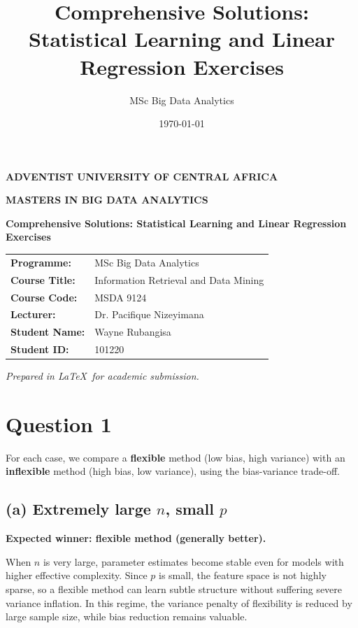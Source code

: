 \documentclass[12pt]{article}
\title{Comprehensive Solutions: Statistical Learning and Linear Regression Exercises}
\author{MSc Big Data Analytics}
\date{\today}
\begin{document}
\begin{titlepage}
\centering
\vspace*{1.5cm}

{\Large \textbf{ADVENTIST UNIVERSITY OF CENTRAL AFRICA}\par}
\vspace{0.4cm}
{\large \textbf{MASTERS IN BIG DATA ANALYTICS}\par}
\vspace{0.4cm}

\vspace{1.8cm}
\vspace{0.5cm}
{\Large \textbf{Comprehensive Solutions: Statistical Learning and Linear Regression Exercises}\par}

\vspace{1.5cm}
\begin{tabular}{>{\bfseries}p{6cm}p{8cm}}
Programme: & MSc Big Data Analytics \\
Course Title: & Information Retrieval and Data Mining \\
Course Code: & MSDA 9124 \\
Lecturer: & Dr. Pacifique Nizeyimana \\
Student Name: & Wayne Rubangisa \\
Student ID: & 101220 \\
\end{tabular}

\vfill
{\normalsize \textit{Prepared in \LaTeX\ for academic submission.}\par}
\vspace{0.8cm}
\end{titlepage}

\section*{Question 1}
For each case, we compare a \textbf{flexible} method (low bias, high variance) with an \textbf{inflexible} method (high bias, low variance), using the bias-variance trade-off.

\subsection*{(a) Extremely large $n$, small $p$}
\textbf{Expected winner: flexible method (generally better).}

When $n$ is very large, parameter estimates become stable even for models with higher effective complexity. Since $p$ is small, the feature space is not highly sparse, so a flexible method can learn subtle structure without suffering severe variance inflation. In this regime, the variance penalty of flexibility is reduced by large sample size, while bias reduction remains valuable.
\end{document}
